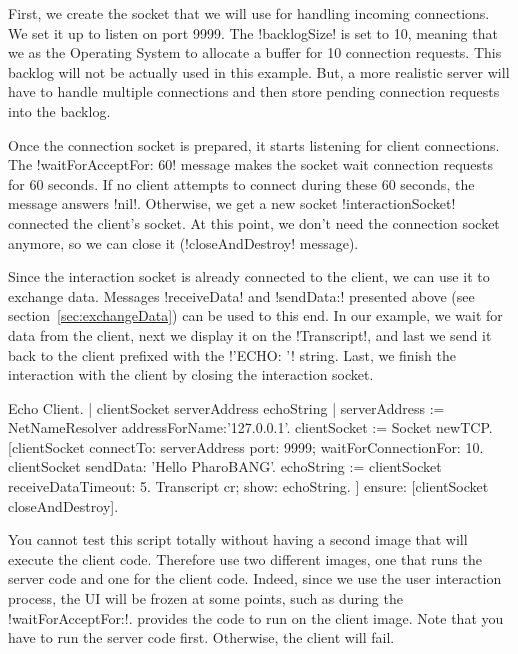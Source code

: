 \documentclass[a4paper,10pt,twoside]{book}
\begin{document}
First, we create the socket that we will use for handling incoming connections.
We set it up to listen on port 9999.
The \ct!backlogSize! is set to 10, meaning that we as the Operating System to allocate a buffer for 10 connection requests. This backlog will not be actually used in this example.
But, a more realistic server will have to handle multiple connections and then store pending connection requests into the backlog.

Once the connection socket is prepared, it starts listening for client connections.
The \ct!waitForAcceptFor: 60! message makes the socket wait connection requests for 60 seconds.
If no client attempts to connect during these 60 seconds, the message answers \ct!nil!.
Otherwise, we get a new socket \ct!interactionSocket! connected the client's socket.
At this point, we don't need the connection socket anymore, so we can close it (\ct!closeAndDestroy! message).

Since the interaction socket is already connected to the client, we can use it to exchange data.
Messages \ct!receiveData! and \ct!sendData:! presented above (see section~\ref{sec:exchangeData}) can be used to this end.
In our example, we wait for data from the client, next we display it on the \ct!Transcript!, and last we send it back to the client prefixed with the \ct!'ECHO: '! string.
Last, we finish the interaction with the client by closing the interaction socket.

\begin{script}[echoClient]{Echo Client.}
| clientSocket serverAddress echoString |
serverAddress := NetNameResolver addressForName:'127.0.0.1'.
clientSocket := Socket newTCP.
[clientSocket 
	connectTo: serverAddress port: 9999;
	waitForConnectionFor: 10.
 clientSocket sendData: 'Hello PharoBANG'.
 echoString  := clientSocket receiveDataTimeout: 5.
 Transcript cr; show: echoString.
] ensure: [clientSocket closeAndDestroy].
\end{script}


You cannot test this script totally without having a second image that will execute the client code. 
Therefore use two different images, one that runs the server code and one for the client code. Indeed, since we use the user interaction process, the \pharo UI will be frozen at some points, such as during the \ct!waitForAcceptFor:!.
 provides the code to run on the client image.
Note that you have to run the server code first.
Otherwise, the client will fail.
\end{document}
